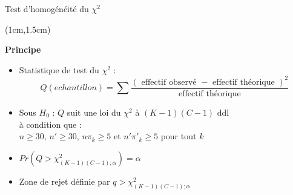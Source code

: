 \documentclass{beamer}
\begin{document}

\begin{frame}{Test d'homogénéité du $\chi^2$}
\begin{textblock*}{\textwidth}(1cm,1.5cm)

\begin{center}{\bf \Large Principe} \end{center}
\begin{itemize}
\item Statistique de test du $\chi^2$ :
$$
Q(echantillon)=\sum\frac{ ({\mbox { effectif observé }} -  {\mbox { effectif théorique }})^2}  { {\mbox { effectif théorique }}}$$

\item Sous $H_0$ : $Q$ suit une loi du $\chi^2$ à $(K-1)(C-1)$ ddl\\
à condition que : \\
$n\geq 30$, $n'\geq 30$, $n\pi_k \geq 5$ et $n'\pi'_k \geq 5$ pour tout 
$k$

\item $Pr(Q > \chi^2_{(K-1)(C-1) ; \alpha} ) = \alpha$ \\
 
\item Zone de rejet définie par $q > \chi^2_{(K-1)(C-1) ; \alpha}$ \\

\end{itemize}

\end{textblock*}

\end{frame}

\end{document}
